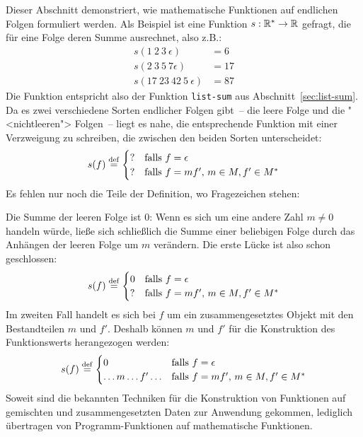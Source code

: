 Dieser Abschnitt demonstriert, wie mathematische Funktionen auf endlichen Folgen
formuliert werden.  Als Beispiel ist eine Funktion $s :
\mathbb{R}^\ast \rightarrow \mathbb{R}$ gefragt, die für eine Folge deren Summe
ausrechnet, also z.B.:
%
\begin{displaymath}
  \begin{split}
  s(1~2~3~\epsilon) &= 6 \\
  s(2~3~5~7\epsilon) &= 17\\
  s(17~23~42~5~\epsilon) &= 87
\end{split}
\end{displaymath}
% 
Die Funktion entspricht also der Funktion \texttt{list-sum} aus
Abschnitt~\ref{sec:list-sum}.  Da es zwei verschiedene Sorten endlicher Folgen gibt~-- die leere
Folge und die "<nichtleeren"> Folgen~-- liegt es
nahe, die entsprechende Funktion mit einer Verzweigung zu schreiben,
die zwischen den beiden Sorten unterscheidet:
%
\begin{displaymath}
  s(f) \stackrel{\rm def}{=}
  \begin{cases}
    ? & \textrm{falls $f = \epsilon$}\\
    ? & \textrm{falls $f = mf'$, $m\in M, f'\in M^\ast$}
  \end{cases}
\end{displaymath}
%
Es fehlen nur noch die Teile der Definition, wo Fragezeichen stehen:

Die Summe der leeren Folge ist $0$:  Wenn es sich um eine andere
Zahl $m \neq 0$ handeln würde, ließe sich schließlich die Summe einer
beliebigen Folge durch das Anhängen der leeren Folge um $m$ verändern.
Die erste Lücke ist also schon geschlossen:
%
\begin{displaymath}
  s(f) \stackrel{\rm def}{=}
  \begin{cases}
    0 & \textrm{falls $f = \epsilon$}\\
    ? & \textrm{falls $f = mf'$, $m\in M, f'\in M^\ast$}
  \end{cases}
\end{displaymath}
%
Im zweiten Fall handelt es sich bei $f$ um ein
zusammengesetztes Objekt mit den Bestandteilen $m$ und $f'$.
Deshalb können $m$ und $f'$ für die Konstruktion des Funktionswerts
herangezogen werden:
%
\begin{displaymath}
  s(f) \stackrel{\rm def}{=}
  \begin{cases}
    0 & \textrm{falls $f = \epsilon$}\\
    \ldots m \ldots f' \ldots & \textrm{falls $f = mf'$, $m\in M, f'\in M^\ast$}
  \end{cases}
\end{displaymath}
%
Soweit sind die bekannten Techniken für die Konstruktion von
Funktionen auf gemischten und zusammengesetzten Daten zur Anwendung
gekommen, lediglich übertragen von Programm-Funktionen auf
mathematische Funktionen.

